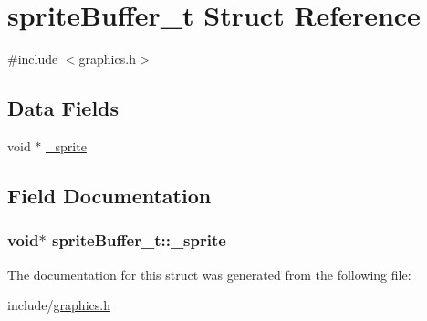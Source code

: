 \hypertarget{structsprite_buffer__t}{}\section{sprite\+Buffer\+\_\+t Struct Reference}
\label{structsprite_buffer__t}


{\ttfamily \#include $<$graphics.\+h$>$}

\subsection*{Data Fields}
\begin{DoxyCompactItemize}
\item 
void $\ast$ \hyperlink{structsprite_buffer__t_a4714aead824e3ab1026dbbbe1f996cb9}{\+\_\+sprite}
\end{DoxyCompactItemize}


\subsection{Field Documentation}
\subsubsection[{\texorpdfstring{\+\_\+sprite}{\_sprite}}]{\setlength{\rightskip}{0pt plus 5cm}void$\ast$ sprite\+Buffer\+\_\+t\+::\+\_\+sprite}\hypertarget{structsprite_buffer__t_a4714aead824e3ab1026dbbbe1f996cb9}{}\label{structsprite_buffer__t_a4714aead824e3ab1026dbbbe1f996cb9}


The documentation for this struct was generated from the following file\+:\begin{DoxyCompactItemize}
\item 
include/\hyperlink{graphics_8h}{graphics.\+h}\end{DoxyCompactItemize}
